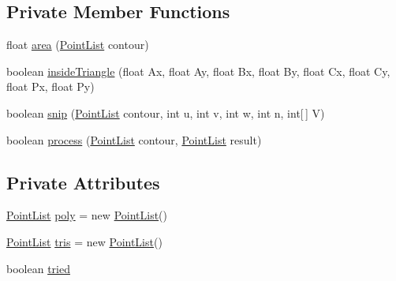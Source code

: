 \subsection*{Private Member Functions}
\begin{DoxyCompactItemize}
\item 
float \mbox{\hyperlink{classorg_1_1newdawn_1_1slick_1_1geom_1_1_basic_triangulator_ade8b558b3ec5771bf8313f841d9aba9a}{area}} (\mbox{\hyperlink{classorg_1_1newdawn_1_1slick_1_1geom_1_1_basic_triangulator_1_1_point_list}{Point\+List}} contour)
\item 
boolean \mbox{\hyperlink{classorg_1_1newdawn_1_1slick_1_1geom_1_1_basic_triangulator_a158a57682ae893087827b8c7fd24e68a}{inside\+Triangle}} (float Ax, float Ay, float Bx, float By, float Cx, float Cy, float Px, float Py)
\item 
boolean \mbox{\hyperlink{classorg_1_1newdawn_1_1slick_1_1geom_1_1_basic_triangulator_a7b9644fd18ac42ce0f128db555d77606}{snip}} (\mbox{\hyperlink{classorg_1_1newdawn_1_1slick_1_1geom_1_1_basic_triangulator_1_1_point_list}{Point\+List}} contour, int u, int v, int w, int n, int\mbox{[}$\,$\mbox{]} V)
\item 
boolean \mbox{\hyperlink{classorg_1_1newdawn_1_1slick_1_1geom_1_1_basic_triangulator_aeb17bc079c7be974c5578b194b57eaf1}{process}} (\mbox{\hyperlink{classorg_1_1newdawn_1_1slick_1_1geom_1_1_basic_triangulator_1_1_point_list}{Point\+List}} contour, \mbox{\hyperlink{classorg_1_1newdawn_1_1slick_1_1geom_1_1_basic_triangulator_1_1_point_list}{Point\+List}} result)
\end{DoxyCompactItemize}
\subsection*{Private Attributes}
\begin{DoxyCompactItemize}
\item 
\mbox{\hyperlink{classorg_1_1newdawn_1_1slick_1_1geom_1_1_basic_triangulator_1_1_point_list}{Point\+List}} \mbox{\hyperlink{classorg_1_1newdawn_1_1slick_1_1geom_1_1_basic_triangulator_ae57823930e5e5413052560e8c85eb92a}{poly}} = new \mbox{\hyperlink{classorg_1_1newdawn_1_1slick_1_1geom_1_1_basic_triangulator_1_1_point_list}{Point\+List}}()
\item 
\mbox{\hyperlink{classorg_1_1newdawn_1_1slick_1_1geom_1_1_basic_triangulator_1_1_point_list}{Point\+List}} \mbox{\hyperlink{classorg_1_1newdawn_1_1slick_1_1geom_1_1_basic_triangulator_af35de217f51e551e95179a91b06c59f2}{tris}} = new \mbox{\hyperlink{classorg_1_1newdawn_1_1slick_1_1geom_1_1_basic_triangulator_1_1_point_list}{Point\+List}}()
\item 
boolean \mbox{\hyperlink{classorg_1_1newdawn_1_1slick_1_1geom_1_1_basic_triangulator_adc09d95b55a0bca60e6d63df97735ce4}{tried}}
\end{DoxyCompactItemize}

